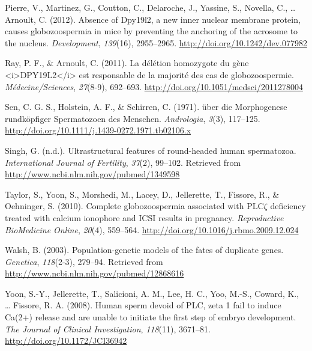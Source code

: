 \documentclass[12pt,twoside]{reedthesis}
\theoremstyle{definition}
\theoremstyle{definition}
\theoremstyle{remark}
\begin{document}
  \hypertarget{ref-Pierre2012}{}
  Pierre, V., Martinez, G., Coutton, C., Delaroche, J., Yassine, S.,
  Novella, C., \ldots{} Arnoult, C. (2012). Absence of Dpy19l2, a new
  inner nuclear membrane protein, causes globozoospermia in mice by
  preventing the anchoring of the acrosome to the nucleus.
  \emph{Development}, \emph{139}(16), 2955--2965.
  \url{http://doi.org/10.1242/dev.077982}
  
  \hypertarget{ref-Ray2011}{}
  Ray, P. F., \& Arnoult, C. (2011). La délétion homozygote du gène
  \textless{}i\textgreater{}DPY19L2\textless{}/i\textgreater{} est
  responsable de la majorité des cas de globozoospermie.
  \emph{Médecine/Sciences}, \emph{27}(8-9), 692--693.
  \url{http://doi.org/10.1051/medsci/2011278004}
  
  \hypertarget{ref-Sen2009}{}
  Sen, C. G. S., Holstein, A. F., \& Schirren, C. (1971). über die
  Morphogenese rundköpfiger Spermatozoen des Menschen. \emph{Andrologia},
  \emph{3}(3), 117--125.
  \url{http://doi.org/10.1111/j.1439-0272.1971.tb02106.x}
  
  \hypertarget{ref-Singh}{}
  Singh, G. (n.d.). Ultrastructural features of round-headed human
  spermatozoa. \emph{International Journal of Fertility}, \emph{37}(2),
  99--102. Retrieved from \url{http://www.ncbi.nlm.nih.gov/pubmed/1349598}
  
  \hypertarget{ref-Taylor2010}{}
  Taylor, S., Yoon, S., Morshedi, M., Lacey, D., Jellerette, T., Fissore,
  R., \& Oehninger, S. (2010). Complete globozoospermia associated with
  PLC\(\zeta\) deficiency treated with calcium ionophore and ICSI results
  in pregnancy. \emph{Reproductive BioMedicine Online}, \emph{20}(4),
  559--564. \url{http://doi.org/10.1016/j.rbmo.2009.12.024}
  
  \hypertarget{ref-Walsh2003}{}
  Walsh, B. (2003). Population-genetic models of the fates of duplicate
  genes. \emph{Genetica}, \emph{118}(2-3), 279--94. Retrieved from
  \url{http://www.ncbi.nlm.nih.gov/pubmed/12868616}
  
  \hypertarget{ref-Yoon2008}{}
  Yoon, S.-Y., Jellerette, T., Salicioni, A. M., Lee, H. C., Yoo, M.-S.,
  Coward, K., \ldots{} Fissore, R. A. (2008). Human sperm devoid of PLC,
  zeta 1 fail to induce Ca(2+) release and are unable to initiate the
  first step of embryo development. \emph{The Journal of Clinical
  Investigation}, \emph{118}(11), 3671--81.
  \url{http://doi.org/10.1172/JCI36942}


\end{document}
